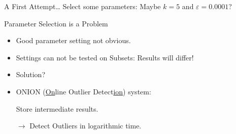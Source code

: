 \documentclass{beamer}
\begin{document}
\begin{frame}{A First Attempt\ldots}
    Select some parameters: \alert{Maybe $k = 5$ and $\varepsilon = 0.0001$}?
    \begin{center}\end{center}
    \begin{center}
    \end{center}
\end{frame}
\begin{frame}{Parameter Selection is a Problem}
    \begin{itemize}
        \item Good parameter setting not obvious. 
        \item Settings can not be tested on Subsets: \alert{Results will differ!}
        \item Solution?\pause

        \item ONION (\underline{On}line Outlier Detect\underline{ion}) system:

            Store intermediate results. 

            $\rightarrow$ Detect Outliers in logarithmic time.
    \end{itemize}
\end{frame}
\end{document}
